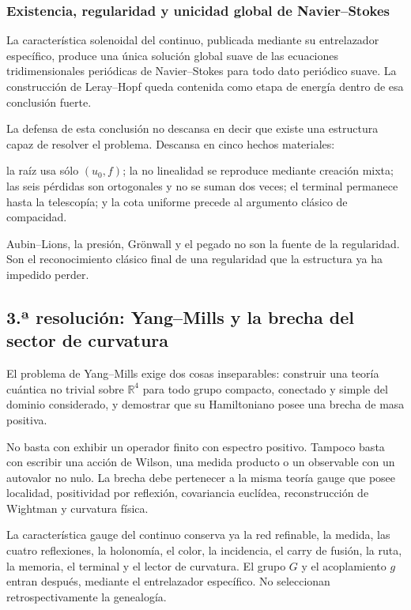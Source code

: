 \subsubsection{Existencia, regularidad y unicidad global de Navier--Stokes}
La característica solenoidal del continuo, publicada mediante su
entrelazador específico, produce una única solución global suave de las
ecuaciones tridimensionales periódicas de Navier--Stokes para todo dato
periódico suave. La construcción de Leray--Hopf queda contenida como etapa de
energía dentro de esa conclusión fuerte.\par
La defensa de esta conclusión no descansa en decir que existe una estructura capaz de resolver el problema. Descansa en cinco hechos materiales:\par
la raíz usa sólo \((u_0,f)\); la no linealidad se reproduce mediante creación mixta; las seis pérdidas son ortogonales y no se suman dos veces; el terminal permanece hasta la telescopía; y la cota uniforme precede al argumento clásico de compacidad.\par
Aubin–Lions, la presión, Grönwall y el pegado no son la fuente de la regularidad. Son el reconocimiento clásico final de una regularidad que la estructura ya ha impedido perder.\par
{}
\subsection{3.ª resolución: Yang–Mills y la brecha del sector de curvatura}
El problema de Yang–Mills exige dos cosas inseparables: construir una teoría cuántica no trivial sobre \(\mathbb R^4\) para todo grupo compacto, conectado y simple del dominio considerado, y demostrar que su Hamiltoniano posee una brecha de masa positiva.\par
No basta con exhibir un operador finito con espectro positivo. Tampoco basta con escribir una acción de Wilson, una medida producto o un observable con un autovalor no nulo. La brecha debe pertenecer a la misma teoría gauge que posee localidad, positividad por reflexión, covariancia euclídea, reconstrucción de Wightman y curvatura física.\par
La característica gauge del continuo conserva ya la red refinable, la medida, las cuatro reflexiones, la holonomía, el color, la incidencia, el carry de fusión, la ruta, la memoria, el terminal y el lector de curvatura. El grupo \(G\) y el acoplamiento \(g\) entran después, mediante el entrelazador específico. No seleccionan retrospectivamente la genealogía.\par
{}

